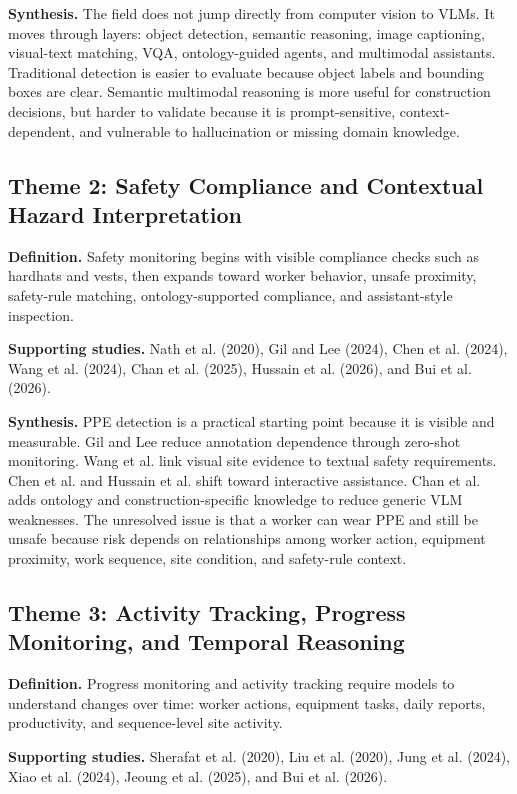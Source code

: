 \documentclass[10pt,letterpaper]{article}
\begin{document}
\textbf{Synthesis.} The field does not jump directly from computer vision to VLMs. It moves through layers: object detection, semantic reasoning, image captioning, visual-text matching, VQA, ontology-guided agents, and multimodal assistants. Traditional detection is easier to evaluate because object labels and bounding boxes are clear. Semantic multimodal reasoning is more useful for construction decisions, but harder to validate because it is prompt-sensitive, context-dependent, and vulnerable to hallucination or missing domain knowledge.

\subsection{Theme 2: Safety Compliance and Contextual Hazard Interpretation}

\textbf{Definition.} Safety monitoring begins with visible compliance checks such as hardhats and vests, then expands toward worker behavior, unsafe proximity, safety-rule matching, ontology-supported compliance, and assistant-style inspection.

\textbf{Supporting studies.} Nath et al. (2020), Gil and Lee (2024), Chen et al. (2024), Wang et al. (2024), Chan et al. (2025), Hussain et al. (2026), and Bui et al. (2026).

\textbf{Synthesis.} PPE detection is a practical starting point because it is visible and measurable. Gil and Lee reduce annotation dependence through zero-shot monitoring. Wang et al. link visual site evidence to textual safety requirements. Chen et al. and Hussain et al. shift toward interactive assistance. Chan et al. adds ontology and construction-specific knowledge to reduce generic VLM weaknesses. The unresolved issue is that a worker can wear PPE and still be unsafe because risk depends on relationships among worker action, equipment proximity, work sequence, site condition, and safety-rule context.

\subsection{Theme 3: Activity Tracking, Progress Monitoring, and Temporal Reasoning}

\textbf{Definition.} Progress monitoring and activity tracking require models to understand changes over time: worker actions, equipment tasks, daily reports, productivity, and sequence-level site activity.

\textbf{Supporting studies.} Sherafat et al. (2020), Liu et al. (2020), Jung et al. (2024), Xiao et al. (2024), Jeoung et al. (2025), and Bui et al. (2026).
\end{document}
